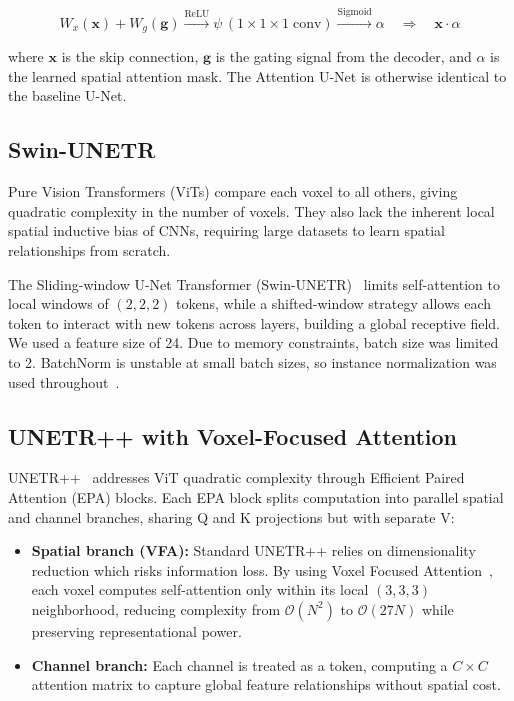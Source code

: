 \documentclass{article}
\begin{document}
\begin{equation}
  W_x(\mathbf{x}) + W_g(\mathbf{g})
  \xrightarrow{\text{ReLU}}
  \psi\,(1{\times}1{\times}1\;\text{conv})
  \xrightarrow{\text{Sigmoid}}
  \alpha
  \quad\Rightarrow\quad
  \mathbf{x} \cdot \alpha
\end{equation}

where $\mathbf{x}$ is the skip connection, $\mathbf{g}$ is the gating signal
from the decoder, and $\alpha$ is the learned spatial attention mask. The
Attention U-Net is otherwise identical to the baseline U-Net.

\subsection{Swin-UNETR}

Pure Vision Transformers (ViTs) compare each voxel to all others, giving
quadratic complexity in the number of voxels. They also lack the inherent
local spatial inductive bias of CNNs, requiring large datasets to learn
spatial relationships from scratch.

The Sliding-window U-Net Transformer (Swin-UNETR)~\cite{hatamizadeh2022swin,liu2021swin} limits
self-attention to local windows of $(2,2,2)$ tokens, while a shifted-window
strategy allows each token to interact with new tokens across layers, building
a global receptive field. We used a feature size of 24. Due to memory
constraints, batch size was limited to 2. BatchNorm is unstable at small batch
sizes, so instance normalization was used throughout~\cite{ulyanov2017instance}.

\subsection{UNETR++ with Voxel-Focused Attention}

UNETR++~\cite{shaker2024unetrpp} addresses ViT quadratic complexity through Efficient
Paired Attention (EPA) blocks. Each EPA block splits computation into parallel
spatial and channel branches, sharing Q and K projections but with separate V:

\begin{itemize}
  \item \textbf{Spatial branch (VFA):} Standard UNETR++ relies on
    dimensionality reduction which risks information loss. By using Voxel
    Focused Attention~\cite{ntanzi2025vfa}, each voxel computes self-attention
    only within its local $(3,3,3)$ neighborhood, reducing complexity from
    $\mathcal{O}(N^2)$ to $\mathcal{O}(27N)$ while preserving representational
    power.
  \item \textbf{Channel branch:} Each channel is treated as a token, computing
    a $C \times C$ attention matrix to capture global feature relationships
    without spatial cost.
\end{itemize}
\end{document}
